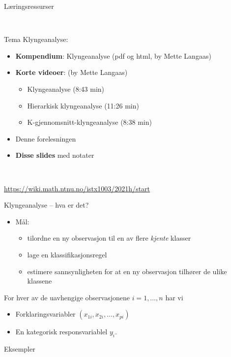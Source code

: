 \documentclass[10pt,ignorenonframetext,]{beamer}
\providecommand{\tightlist}{%
  \setlength{\itemsep}{0pt}\setlength{\parskip}{0pt}}
\begin{document}
\begin{frame}{Læringsressurser}
\protect\hypertarget{luxe6ringsressurser}{}

\vspace{2mm}

\(~\)

Tema Klyngeanalyse:

\vspace{2mm}

\begin{itemize}
\item
  \textbf{Kompendium}: Klyngeanalyse (pdf og html, by Mette Langaas)
\item
  \textbf{Korte videoer}: (by Mette Langaas)

  \begin{itemize}
  \tightlist
  \item
    Klyngeanalyse (8:43 min)
  \item
    Hierarkisk klyngeanalyse (11:26 min)
  \item
    K-gjennomsnitt-klyngeanalyse (8:38 min)
  \end{itemize}
\item
  Denne forelesningen
\item
  \textbf{Disse slides} med notater
\end{itemize}

\(~\)

\url{https://wiki.math.ntnu.no/istx1003/2021h/start}

\end{frame}

\begin{frame}{Klyngeanalyse -- hva er det?}
\protect\hypertarget{klyngeanalyse-hva-er-det}{}

\begin{itemize}
\item
  Mål:

  \begin{itemize}
  \item
    tilordne en ny observasjon til en av flere \emph{kjente} klasser
  \item
    lage en klassifikasjonsregel
  \item
    estimere sannsynligheten for at en ny observasjon tilhører de ulike
    klassene
  \end{itemize}
\end{itemize}

\vspace{2mm}

For hver av de uavhengige observasjonene \(i=1,\ldots,n\) har vi

\begin{itemize}
\tightlist
\item
  Forklaringsvariabler \((x_{1i},x_{2i},\ldots,x_{pi})\)
\item
  En kategorisk responsvariablel \(y_i\).
\end{itemize}

\end{frame}

\begin{frame}

\begin{block}{Eksempler}

\end{block}

\end{frame}
\end{document}
